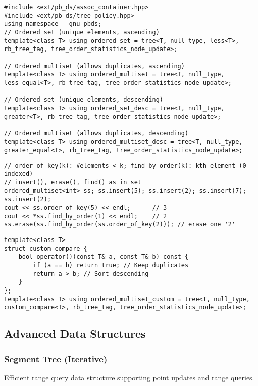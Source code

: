 \documentclass[11pt,a4paper]{article}
\begin{document}
\begin{lstlisting}[caption={Ordered Set Template}]
#include <ext/pb_ds/assoc_container.hpp>
#include <ext/pb_ds/tree_policy.hpp>
using namespace __gnu_pbds;
// Ordered set (unique elements, ascending)
template<class T> using ordered_set = tree<T, null_type, less<T>, rb_tree_tag, tree_order_statistics_node_update>;

// Ordered multiset (allows duplicates, ascending)
template<class T> using ordered_multiset = tree<T, null_type, less_equal<T>, rb_tree_tag, tree_order_statistics_node_update>;

// Ordered set (unique elements, descending)
template<class T> using ordered_set_desc = tree<T, null_type, greater<T>, rb_tree_tag, tree_order_statistics_node_update>;

// Ordered multiset (allows duplicates, descending)
template<class T> using ordered_multiset_desc = tree<T, null_type, greater_equal<T>, rb_tree_tag, tree_order_statistics_node_update>;
\end{lstlisting}

\begin{lstlisting}[caption={Ordered Set Functions}]
// order_of_key(k): #elements < k; find_by_order(k): kth element (0-indexed)
// insert(), erase(), find() as in set
ordered_multiset<int> ss; ss.insert(5); ss.insert(2); ss.insert(7); ss.insert(2);
cout << ss.order_of_key(5) << endl;      // 3
cout << *ss.find_by_order(1) << endl;    // 2
ss.erase(ss.find_by_order(ss.order_of_key(2))); // erase one '2'
\end{lstlisting}

\begin{lstlisting}[caption={Custom Comparator for Ordered Set}]
template<class T>
struct custom_compare {
    bool operator()(const T& a, const T& b) const {
        if (a == b) return true; // Keep duplicates
        return a > b; // Sort descending
    }
};
template<class T> using ordered_multiset_custom = tree<T, null_type, custom_compare<T>, rb_tree_tag, tree_order_statistics_node_update>;
\end{lstlisting}

\newpage

\subsection{Advanced Data Structures}

\subsubsection{Segment Tree (Iterative)}
Efficient range query data structure supporting point updates and range queries.
\end{document}

